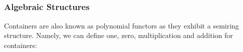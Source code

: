\begin{code}%
\>[0]\AgdaSpace{}%
\AgdaSymbol{:}\AgdaSpace{}%
\AgdaSpace{}%
\AgdaSpace{}%
\<%
\\
\>[0]\AgdaSpace{}%
\AgdaSymbol{=}\AgdaSpace{}%
\AgdaSpace{}%
\AgdaSpace{}%
\<%
\\
\>[0][@{}l@{\AgdaIndent{0}}]%
\>[2]\<%
\\
%
\>[2]\AgdaSpace{}%
\AgdaSymbol{:}\AgdaSpace{}%
\AgdaSpace{}%
\AgdaSpace{}%
\<%
\\
%
\>[2]\AgdaSpace{}%
\AgdaSpace{}%
\AgdaSymbol{=}\AgdaSpace{}%
\<%
\\
%
\>[2]\AgdaSpace{}%
\AgdaSymbol{(}\AgdaSpace{}%
\AgdaSymbol{)}\AgdaSpace{}%
\AgdaSymbol{=}\AgdaSpace{}%
\<%
\\
%
\\[\AgdaEmptyExtraSkip]%
%
\>[2]\AgdaSpace{}%
\AgdaSymbol{:}\AgdaSpace{}%
\AgdaSymbol{(}\AgdaSpace{}%
\AgdaSymbol{:}\AgdaSpace{}%
\AgdaSymbol{)}\AgdaSpace{}%
\AgdaSpace{}%
\AgdaSpace{}%
\AgdaSymbol{(}\AgdaSpace{}%
\AgdaSymbol{)}\AgdaSpace{}%
\AgdaSpace{}%
\AgdaSpace{}%
\<%
\\
%
\>[2]\AgdaSpace{}%
\AgdaSpace{}%
\AgdaSymbol{()}\<%
\\
%
\>[2]\AgdaSpace{}%
\AgdaSymbol{(}\AgdaSpace{}%
\AgdaSymbol{)}\AgdaSpace{}%
\AgdaSpace{}%
\AgdaSymbol{=}\AgdaSpace{}%
\AgdaSpace{}%
\<%
\end{code}

\subsubsection*{Algebraic Structures}

Containers are also known as polynomial functors as they exhibit a semiring structure. Namely, we can define one, zero, multiplication and addition for containers:

